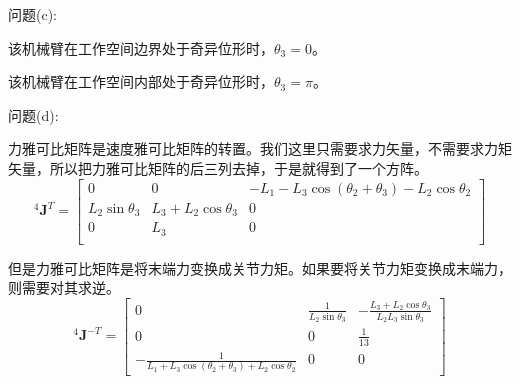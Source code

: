 \documentclass{homework}
\begin{document}
\begin{sol}
问题(c):

该机械臂在工作空间边界处于奇异位形时，$ \theta_3 = 0 $。

该机械臂在工作空间内部处于奇异位形时，$ \theta_3 = \pi $。

问题(d):

力雅可比矩阵是速度雅可比矩阵的转置。我们这里只需要求力矢量，不需要求力矩矢量，所以把力雅可比矩阵的后三列去掉，于是就得到了一个方阵。
\[
  {^4}\mathbf{J}^T =
  \begin{bmatrix}
    0 & 0 & - L_1 - L_3 \cos(\theta_2 + \theta_3) - L_2 \cos\theta_2 \\
    L_2 \sin\theta_3 & L_3 + L_2 \cos\theta_3 & 0 \\
    0 & L_3 & 0 \\
  \end{bmatrix}
\]

但是力雅可比矩阵是将末端力变换成关节力矩。如果要将关节力矩变换成末端力，则需要对其求逆。
\[
  {^4}\mathbf{J}^{-T} =
  \begin{bmatrix}
    0 & \frac{1}{L_2 \sin\theta_3} & -\frac{L_3 + L_2 \cos\theta_3}{L_2 L_3 \sin\theta_3} \\
    0 & 0 & \frac{1}{13} \\
    -\frac{1}{L_1 + L_3 \cos(\theta_2 + \theta_3) + L_2 \cos\theta_2} & 0 & 0 
  \end{bmatrix}
\]

\end{sol}

\question 
\end{document}
